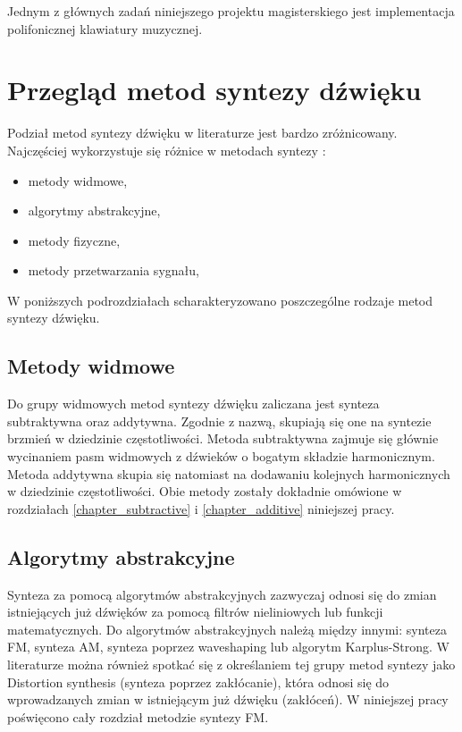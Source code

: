%
%

Jednym z głównych zadań niniejszego projektu magisterskiego jest implementacja polifonicznej klawiatury muzycznej.



\section{Przegląd metod syntezy dźwięku}
Podział metod syntezy dźwięku w literaturze jest bardzo zróżnicowany. Najczęściej wykorzystuje się różnice w metodach syntezy \cite{metody_syntezy}:
\begin{itemize}
	\item metody widmowe,
	\item algorytmy abstrakcyjne,
	\item metody fizyczne,
	\item metody przetwarzania sygnału,
\end{itemize}

W poniższych podrozdziałach scharakteryzowano poszczególne rodzaje metod syntezy dźwięku.

\subsection{Metody widmowe}
Do grupy widmowych metod syntezy dźwięku zaliczana jest synteza subtraktywna oraz addytywna. Zgodnie z nazwą, skupiają się one na syntezie brzmień w dziedzinie częstotliwości. Metoda subtraktywna zajmuje się głównie wycinaniem pasm widmowych z dźwieków o bogatym składzie harmonicznym. Metoda addytywna skupia się natomiast na dodawaniu kolejnych harmonicznych w dziedzinie częstotliwości. Obie metody zostały dokładnie omówione w rozdziałach \ref{chapter_subtractive} i \ref{chapter_additive} niniejszej pracy.

\subsection{Algorytmy abstrakcyjne}
Synteza za pomocą algorytmów abstrakcyjnych zazwyczaj odnosi się do zmian istniejących już dźwięków za pomocą filtrów nieliniowych lub funkcji matematycznych. Do algorytmów abstrakcyjnych należą między innymi: synteza FM, synteza AM, synteza poprzez waveshaping lub algorytm Karplus-Strong. W literaturze można również spotkać się z określaniem tej grupy metod syntezy jako Distortion synthesis (synteza poprzez zakłócanie), która odnosi się do wprowadzanych zmian w istniejącym już dźwięku (zakłóceń). W niniejszej pracy poświęcono cały rozdział metodzie syntezy FM.

